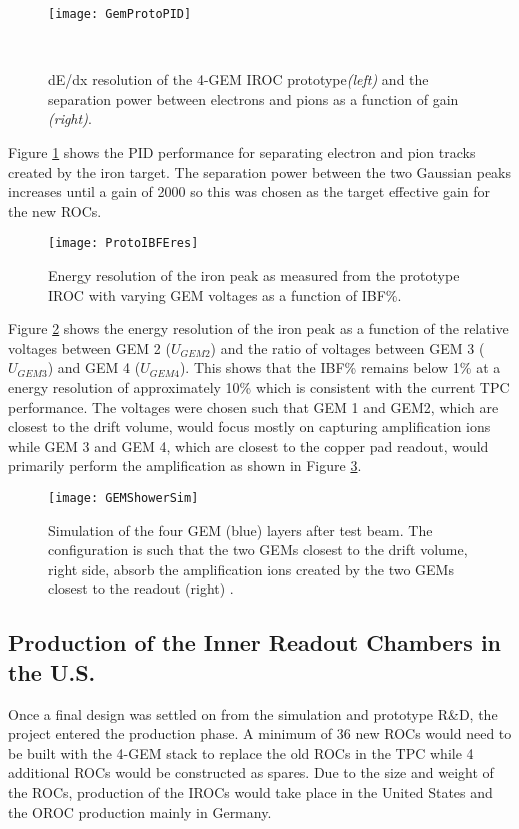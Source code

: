 \begin{figure}[h]
\texttt{[image: GemProtoPID]}
\centering
\caption{dE/dx resolution of the 4-GEM IROC prototype\textit{(left)} and the separation power between electrons and pions as a function of gain \textit{(right)}\cite{CERN-LHCC-2015-002}.}\

\label{fig:GemProtoPID}
\end{figure}

Figure \ref{fig:GemProtoPID} shows the PID performance for separating electron and pion tracks created by the iron target.  The separation power between the two Gaussian peaks increases until a gain of 2000 so this was chosen as the target effective gain for the new ROCs.



\begin{figure}[h]
\texttt{[image: ProtoIBFEres]}
\centering
\caption{Energy resolution of the iron peak as measured from the prototype IROC with varying GEM voltages as a function of IBF\%\cite{CERN-LHCC-2015-002}.}
\label{fig:ProtoIBFEres}
\end{figure}

\noindent
Figure \ref{fig:ProtoIBFEres} shows the energy resolution of the iron peak as a function of the relative voltages between GEM 2 ($U_{GEM2}$) and the ratio of voltages between GEM 3 ($U_{GEM3}$) and GEM 4 ($U_{GEM4}$).  This shows that the IBF\% remains below 1\% at a energy resolution of approximately 10\% which is consistent with the current TPC performance.  The voltages were chosen such that GEM 1 and GEM2, which are closest to the drift volume, would focus mostly on capturing amplification ions while GEM 3 and GEM 4, which are closest to the copper pad readout, would primarily perform the amplification as shown in Figure \ref{fig:showersim}.

\begin{figure}[h]
\texttt{[image: GEMShowerSim]}
\centering
\caption{Simulation of the four GEM (blue) layers after test beam.  The configuration is such that the two GEMs closest to the drift volume, right side, absorb the amplification ions created by the two GEMs closest to the readout (right) \cite{CERN-LHCC-2015-002}.}
\label{fig:showersim}
\end{figure}



\subsection{Production of the Inner Readout Chambers in the U.S.}
Once a final design was settled on from the simulation and prototype R\&D, the project entered the production phase.  A minimum of 36 new ROCs would need to be built with the 4-GEM stack to replace the old ROCs in the TPC while 4 additional ROCs would be constructed as spares.  Due to the size and weight of the ROCs, production of the IROCs would take place in the United States and the OROC production mainly in Germany. 



